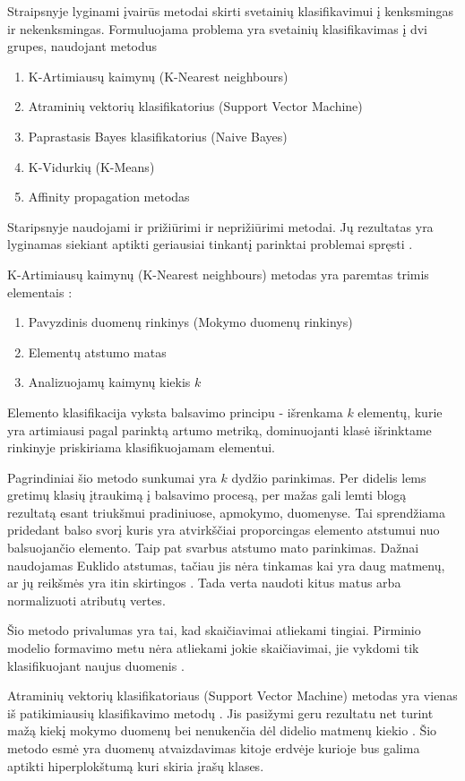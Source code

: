 Straipsnyje lyginami įvairūs metodai skirti svetainių klasifikavimui į kenksmingas ir nekenksmingas. Formuluojama problema yra svetainių klasifikavimas į dvi grupes, naudojant metodus \cite{comp}
\begin{enumerate}
 \item K-Artimiausų kaimynų (K-Nearest neighbours)
 \item Atraminių vektorių klasifikatorius (Support Vector Machine)
 \item Paprastasis Bayes klasifikatorius (Naive Bayes)
 \item K-Vidurkių (K-Means)
 \item Affinity propagation metodas
\end{enumerate}

Staripsnyje naudojami ir prižiūrimi ir neprižiūrimi metodai. Jų rezultatas yra lyginamas siekiant aptikti geriausiai tinkantį parinktai problemai spręsti \cite{comp}.

K-Artimiausų kaimynų (K-Nearest neighbours) metodas yra paremtas trimis elementais \cite{Wu2008}:
\begin{enumerate}
    \item Pavyzdinis duomenų rinkinys (Mokymo duomenų rinkinys)
    \item Elementų atstumo matas
    \item Analizuojamų kaimynų kiekis $k$
\end{enumerate}
Elemento klasifikacija vyksta balsavimo principu - išrenkama $k$ elementų, kurie yra artimiausi pagal parinktą artumo metriką, dominuojanti klasė išrinktame rinkinyje priskiriama klasifikuojamam elementui.

Pagrindiniai šio metodo sunkumai yra $k$ dydžio parinkimas. Per didelis lems gretimų klasių įtraukimą į balsavimo procesą, per mažas gali lemti blogą rezultatą esant triukšmui pradiniuose, apmokymo, duomenyse. Tai sprendžiama pridedant balso svorį \cite{Wu2008} kuris yra atvirkščiai proporcingas elemento atstumui nuo balsuojančio elemento. Taip pat svarbus atstumo mato parinkimas. Dažnai naudojamas Euklido atstumas, tačiau jis nėra tinkamas kai yra daug matmenų, ar jų reikšmės yra itin skirtingos \cite{Wu2008}. Tada verta naudoti kitus matus arba normalizuoti atributų vertes.

Šio metodo privalumas yra tai,  kad skaičiavimai atliekami tingiai. Pirminio modelio formavimo metu nėra atliekami jokie skaičiavimai, jie vykdomi tik klasifikuojant naujus duomenis \cite{Wu2008}.

Atraminių vektorių klasifikatoriaus (Support Vector Machine) metodas yra vienas iš patikimiausių klasifikavimo metodų \cite{Wu2008}. Jis pasižymi geru rezultatu net turint mažą kiekį mokymo duomenų bei nenukenčia dėl didelio matmenų kiekio \cite{Wu2008}. Šio metodo esmė yra duomenų atvaizdavimas kitoje erdvėje kurioje bus galima aptikti hiperplokštumą kuri skiria įrašų klases.

